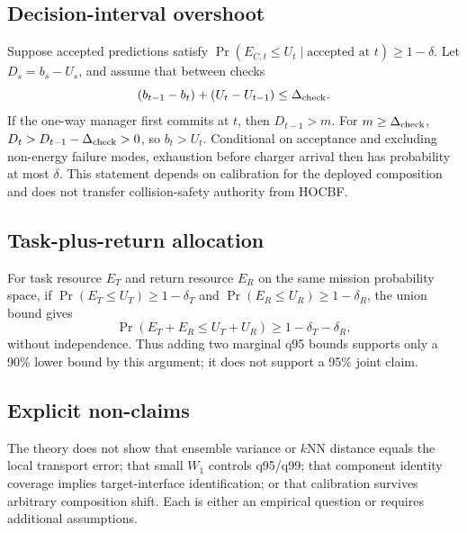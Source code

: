 \subsection{Decision-interval overshoot}

Suppose accepted predictions satisfy
\(\Pr(E_{C,t}\leq U_t\mid\text{accepted at }t)\geq1-\delta\).
Let \(D_s=b_s-U_s\), and assume that between checks
\[
(b_{t-1}-b_t)+(U_t-U_{t-1})\leq\Delta_{\rm check}.
\]
If the one-way manager first commits at \(t\), then \(D_{t-1}>m\). For \(m\geq\Delta_{\rm check}\),
\(D_t>D_{t-1}-\Delta_{\rm check}>0\), so \(b_t>U_t\). Conditional on acceptance and excluding non-energy failure modes, exhaustion before charger arrival then has probability at most \(\delta\). This statement depends on calibration for the deployed composition and does not transfer collision-safety authority from HOCBF.

\subsection{Task-plus-return allocation}

For task resource \(E_T\) and return resource \(E_R\) on the same mission probability space, if
\(\Pr(E_T\leq U_T)\geq1-\delta_T\) and
\(\Pr(E_R\leq U_R)\geq1-\delta_R\), the union bound gives
\[
\Pr(E_T+E_R\leq U_T+U_R)\geq1-\delta_T-\delta_R,
\]
without independence. Thus adding two marginal q95 bounds supports only a 90\% lower bound by this argument; it does not support a 95\% joint claim.

\subsection{Explicit non-claims}

The theory does not show that ensemble variance or $k$NN distance equals the local transport error; that small \(W_1\) controls q95/q99; that component identity coverage implies target-interface identification; or that calibration survives arbitrary composition shift. Each is either an empirical question or requires additional assumptions.
